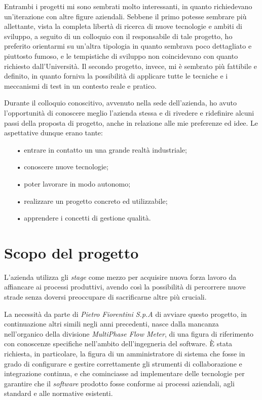 Entrambi i progetti mi sono sembrati molto interessanti, in quanto richiedevano un'iterazione con altre figure aziendali. Sebbene il primo potesse sembrare più allettante, vista la completa libertà di ricerca di nuove tecnologie e ambiti di sviluppo, a seguito di un colloquio con il responsabile di tale progetto, ho preferito orientarmi su un'altra tipologia in quanto sembrava poco dettagliato e piuttosto fumoso, e le tempistiche di sviluppo non coincidevano con quanto richiesto dall'Università. Il secondo progetto, invece, mi è sembrato più fattibile e definito, in quanto forniva la possibilità di applicare tutte le tecniche e i meccanismi di test in un contesto reale e pratico.

Durante il colloquio conoscitivo, avvenuto nella sede dell'azienda, ho avuto l'opportunità di conoscere meglio l'azienda stessa e di rivedere e ridefinire alcuni passi della proposta di progetto, anche in relazione alle mie preferenze ed idee. Le aspettative dunque erano tante:
\begin{itemize}
\item[•] entrare in contatto un una grande realtà industriale;
\item[•] conoscere nuove tecnologie;
\item[•] poter lavorare in modo autonomo;
\item[•] realizzare un progetto concreto ed utilizzabile;
\item[•] apprendere i concetti di gestione qualità.
\end{itemize}


\section{Scopo del progetto}

L'azienda utilizza gli \textit{stage} come mezzo per acquisire nuova forza lavoro da affiancare ai processi produttivi, avendo così la possibilità di percorrere nuove strade senza doversi preoccupare di sacrificarne altre più cruciali. 

La necessità da parte di \textit{Pietro Fiorentini S.p.A} di avviare questo progetto, in continuazione altri simili negli anni precedenti, nasce dalla mancanza nell'organico della divisione \textit{MultiPhase Flow Meter}, di una figura di riferimento con conoscenze specifiche nell'ambito dell'ingegneria del software. È stata richiesta, in particolare, la figura di un amministratore di sistema che fosse in grado di configurare e gestire correttamente gli strumenti di collaborazione e integrazione continua, e che cominciasse ad implementare delle tecnologie per garantire che il \textit{software} prodotto fosse conforme ai processi aziendali, agli standard e alle normative esistenti. 

